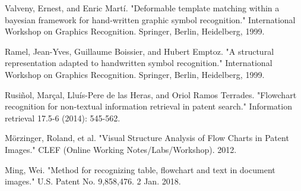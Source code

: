 \documentclass[conference,twocolumn]{IEEEtran}
\begin{document}

%
%
%
\begin{thebibliography}{1}

Valveny, Ernest, and Enric Martí. "Deformable template matching within a bayesian framework for hand-written graphic symbol recognition." International Workshop on Graphics Recognition. Springer, Berlin, Heidelberg, 1999.

Ramel, Jean-Yves, Guillaume Boissier, and Hubert Emptoz. "A structural representation adapted to handwritten symbol recognition." International Workshop on Graphics Recognition. Springer, Berlin, Heidelberg, 1999.

Rusiñol, Marçal, Lluís-Pere de las Heras, and Oriol Ramos Terrades. "Flowchart recognition for non-textual information retrieval in patent search." Information retrieval 17.5-6 (2014): 545-562.

Mörzinger, Roland, et al. "Visual Structure Analysis of Flow Charts in Patent Images." CLEF (Online Working Notes/Labs/Workshop). 2012.

Ming, Wei. "Method for recognizing table, flowchart and text in document images." U.S. Patent No. 9,858,476. 2 Jan. 2018.


\end{thebibliography}

% 
\end{document}
